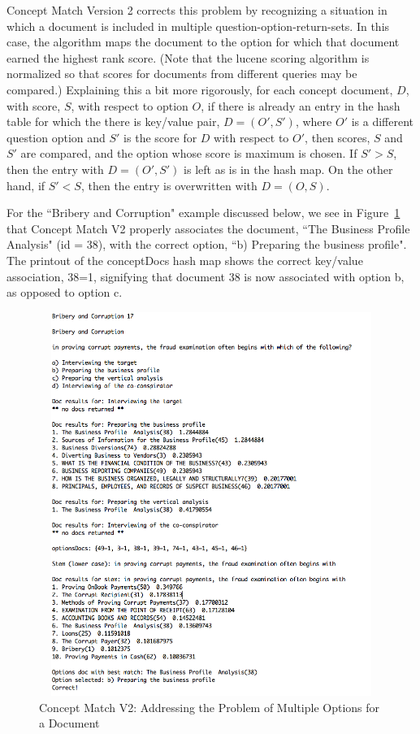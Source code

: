 Concept Match Version 2 corrects this problem by recognizing a situation in which a document is included in multiple question-option-return-sets.  In this case, the algorithm maps the document to the option for which that document earned the highest rank score.  (Note that the lucene scoring algorithm is normalized so that scores for documents from different queries may be compared.)  Explaining this a bit more rigorously, for each concept document, $D$, with score, $S$, with respect to option $O$, if there is already an entry in the hash table for which the there is key/value pair, $D=(O',S')$, where $O'$ is a different question option and $S'$ is the score for $D$ with respect to $O'$, then scores, $S$ and $S'$ are compared, and the option whose score is maximum is chosen. If $S' > S$, then the entry with $D = (O',S')$ is left as is in the hash map. On the other hand, if $S' < S$, then the entry is overwritten with $D = (O,S)$.

For the ``Bribery and Corruption" example discussed below, we see in Figure~\ref{fig:concept_match_v2_multiple_concept_docs} that Concept Match V2 properly associates the document, ``The Business Profile Analysis" (id = 38), with the correct option, ``b) Preparing the business profile".  The printout of the conceptDocs hash map shows the correct key/value association, 38=1, signifying that document 38 is now associated with option b, as opposed to option c.


\begin{figure}
\centering
\vspace{1.0in}
\includegraphics[width=125mm, height=125mm]{concept_match_v2_multiple_concept_docs.png}
\caption{Concept Match V2: Addressing the Problem of Multiple Options for a Document}
\label{fig:concept_match_v2_multiple_concept_docs}
\end{figure}

